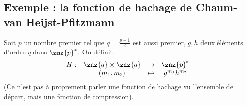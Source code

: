         \subsection{Exemple : la fonction de hachage de Chaum-van Heijst-Pfitzmann}
            Soit $p$ un nombre premier tel que $q = \frac{p - 1}2$ est aussi premier, $g,h$ deux éléments d'ordre $q$ dans $\znz{p}^*$. On définit 
            \begin{align*}
                \begin{array}{cccc}
                    H : & \znz{q} \times \znz{q} & \to & \znz{p}^* \\
                    & (m_1, m_2) & \mapsto & g^{m_1} h^{m_2} \\
                \end{array}
            \end{align*}
            (Ce n'est pas à proprement parler une fonction de hachage vu l'ensemble de départ, mais une fonction de compression). 
